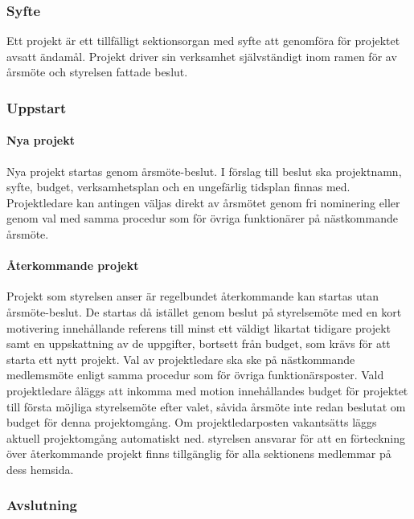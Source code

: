 \documentclass{../resources/dgovdoc}
\begin{document}
\subsubsection{Syfte}

Ett projekt är ett tillfälligt sektionsorgan med syfte att genomföra för
projektet avsatt ändamål. Projekt driver sin verksamhet självständigt inom
ramen för av årsmöte och styrelsen fattade beslut.

\subsubsection{Uppstart}

\paragraph{Nya projekt}

Nya projekt startas genom årsmöte-beslut. I förslag till beslut ska projektnamn,
syfte, budget, verksamhetsplan och en ungefärlig tidsplan finnas med.
Projektledare kan antingen väljas direkt av årsmötet genom fri nominering
eller genom val med samma procedur som för övriga funktionärer på
nästkommande årsmöte.

\paragraph{Återkommande projekt}

Projekt som styrelsen anser är regelbundet återkommande kan startas
utan årsmöte-beslut. De startas då istället genom beslut på styrelsemöte med en kort
motivering innehållande referens till minst ett väldigt likartat tidigare
projekt samt en uppskattning av de uppgifter, bortsett från budget, som krävs
för att starta ett nytt projekt. Val av projektledare ska ske på nästkommande
medlemsmöte enligt samma procedur som för övriga funktionärsposter. Vald projektledare
åläggs att inkomma med motion innehållandes budget för projektet till första
möjliga styrelsemöte efter valet, såvida årsmöte inte redan beslutat om budget för denna
projektomgång. Om projektledarposten vakantsätts läggs aktuell projektomgång
automatiskt ned. styrelsen ansvarar för att en förteckning över återkommande
projekt finns tillgänglig för alla sektionens medlemmar på dess hemsida.

\subsubsection{Avslutning}
\end{document}
